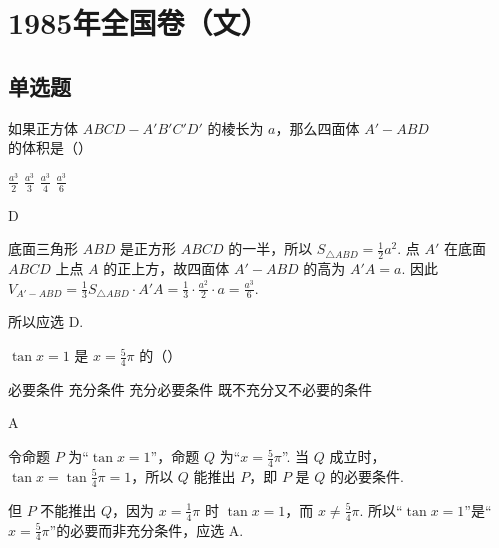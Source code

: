 \chapter{1985年全国卷（文）}

\section{单选题}

\begin{problem}

如果正方体 \(ABCD - A'B'C'D'\) 的棱长为 \(a\)，那么四面体 \(A' - ABD\) 的体积是（\quad）

\choices
    {\(\frac{a^3}{2}\)}
    {\(\frac{a^3}{3}\)}
    {\(\frac{a^3}{4}\)}
    {\(\frac{a^3}{6}\)}

\begin{answer}
D
\end{answer}

\begin{solution}
底面三角形 \(ABD\) 是正方形 \(ABCD\) 的一半，所以
\(S_{\triangle ABD}=\frac{1}{2}a^2\). 点 \(A'\) 在底面 \(ABCD\) 上点 \(A\) 的正上方，故四面体 \(A'-ABD\) 的高为 \(A'A=a\). 因此
\(V_{A'-ABD}=\frac{1}{3}S_{\triangle ABD}\cdot A'A=\frac{1}{3}\cdot\frac{a^2}{2}\cdot a=\frac{a^3}{6}\).

所以应选 D.
\end{solution}
\end{problem}

\begin{problem}

\(\tan x = 1\) 是 \(x = \frac{5}{4}\pi\) 的（\quad）

\choices
    {必要条件}
    {充分条件}
    {充分必要条件}
    {既不充分又不必要的条件}

\begin{answer}
A
\end{answer}

\begin{solution}
令命题 \(P\) 为“\(\tan x=1\)”，命题 \(Q\) 为“\(x=\frac{5}{4}\pi\)”. 当 \(Q\) 成立时，
\(\tan x=\tan\frac{5}{4}\pi=1\)，所以 \(Q\) 能推出 \(P\)，即 \(P\) 是 \(Q\) 的必要条件.

但 \(P\) 不能推出 \(Q\)，因为 \(x=\frac{1}{4}\pi\) 时 \(\tan x=1\)，而 \(x\ne\frac{5}{4}\pi\). 所以“\(\tan x=1\)”是“\(x=\frac{5}{4}\pi\)”的必要而非充分条件，应选 A.
\end{solution}
\end{problem}

